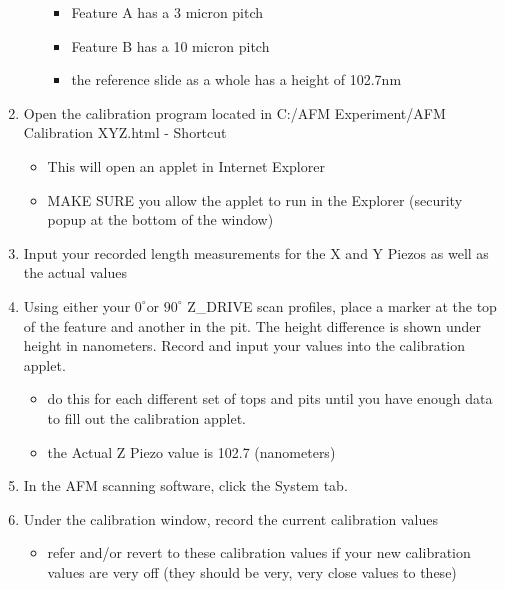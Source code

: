 \documentclass{../lab}
\begin{document}
\begin{enumerate}
\begin{itemize}
        \begin{itemize}
            \item Feature A has a 3 micron pitch

            \item Feature B has a 10 micron pitch

            \item the reference slide as a whole has a height of 102.7nm
        \end{itemize}

    \end{itemize}

    \item Open the calibration program located in C:/AFM Experiment/AFM Calibration XYZ.html - Shortcut

    \begin{itemize}
        \item This will open an applet in Internet Explorer

        \item MAKE SURE you allow the applet to run in the Explorer (security popup at the bottom of the window)
    \end{itemize}

    \item Input your recorded length measurements for the X and Y Piezos as well as the actual values

    \item Using either your $0^\circ$or $90^\circ$ Z\_DRIVE scan profiles, place a marker at the top of the feature and another in the pit.  The height difference is shown under height in nanometers. Record and input your values into the calibration applet.

    \begin{itemize}
        \item do this for each different set of tops and pits until you have enough data to fill out the calibration applet.

        \item the Actual Z Piezo value is 102.7 (nanometers)
    \end{itemize}

    \item In the AFM scanning software, click the System tab.

    \item Under the calibration window, record the current calibration values

    \begin{itemize}
        \item refer and/or revert to these calibration values if your new calibration values are very off (they should be very, very close values to these)
    \end{itemize}


\end{enumerate}
\end{document}
